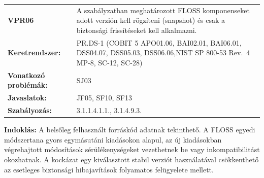 \documentclass[12pt,magyar,a4paper,oneside]{scrreprt}
\begin{document}
\begin{longtable}[]{@{}ll@{}}
\toprule
\endhead
\begin{minipage}[t]{0.16\columnwidth}\raggedright
\textbf{VPR06}\strut
\end{minipage} & \begin{minipage}[t]{0.79\columnwidth}\raggedright
A szabályzatban meghatározott FLOSS komponenseket adott verzión kell
rögzíteni (snapshot) és csak a biztonsági frissítéseket kell
alkalmazni.\strut
\end{minipage}\tabularnewline
\begin{minipage}[t]{0.16\columnwidth}\raggedright
\textbf{Keretrendszer:}\strut
\end{minipage} & \begin{minipage}[t]{0.79\columnwidth}\raggedright
PR.DS-1 (COBIT 5 APO01.06, BAI02.01, BAI06.01, DSS04.07, DSS05.03,
DSS06.06,NIST SP 800-53 Rev.~4 MP-8, SC-12, SC-28)\strut
\end{minipage}\tabularnewline
\begin{minipage}[t]{0.16\columnwidth}\raggedright
\textbf{Vonatkozó problémák:}\strut
\end{minipage} & \begin{minipage}[t]{0.79\columnwidth}\raggedright
SJ03\strut
\end{minipage}\tabularnewline
\begin{minipage}[t]{0.16\columnwidth}\raggedright
\textbf{Javaslatok:}\strut
\end{minipage} & \begin{minipage}[t]{0.79\columnwidth}\raggedright
JF05, SF10, SF13\strut
\end{minipage}\tabularnewline
\begin{minipage}[t]{0.16\columnwidth}\raggedright
\textbf{Szabályozás:}\strut
\end{minipage} & \begin{minipage}[t]{0.79\columnwidth}\raggedright
3.1.1.4.1.1., 3.1.4.9.3.\strut
\end{minipage}\tabularnewline
\bottomrule
\end{longtable}

\textbf{Indoklás: } A belsőleg felhasznált forráskód adatnak tekinthető.
A FLOSS egyedi módszertana gyors egymásutáni kiadásokon alapul, az új
kiadásokban végrehajtott módosítások sérülékenységeket vezethetnek be
vagy inkompatibilitást okozhatnak. A kockázat egy kiválasztott stabil
verziót használatával csökkenthető az esetleges biztonsági hibajavítások
folyamatos felügyelete mellett.
\end{document}
